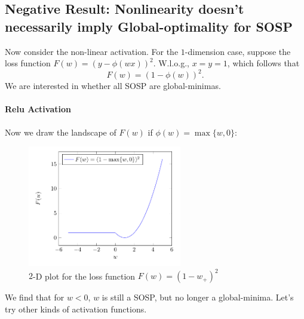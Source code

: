 \subsection{Negative Result: Nonlinearity doesn't necessarily imply Global-optimality for SOSP}
Now consider the non-linear activation. For the $1$-dimension case, suppose the loss function $F(w) = (y - \phi(wx))^2$. W.l.o.g., $x=y=1$, which follows that
\[
F(w) = (1-\phi(w))^2.
\]
We are interested in whether all SOSP are global-minimas.
\paragraph{Relu Activation}Now we draw the landscape of $F(w)$ if $\phi(w)=\max\{w,0\}$:
\begin{figure}[H]
\centering
\includegraphics[width=0.6\textwidth]{Fifth_lecture/f_3.pdf}
\caption{$2$-D plot for the loss function $F(w) = (1-w_+)^2$}
\label{fig:5:3}
\end{figure}
We find that for $w<0$, $w$ is still a SOSP, but no longer a global-minima.
Let's try other kinds of activation functions.
